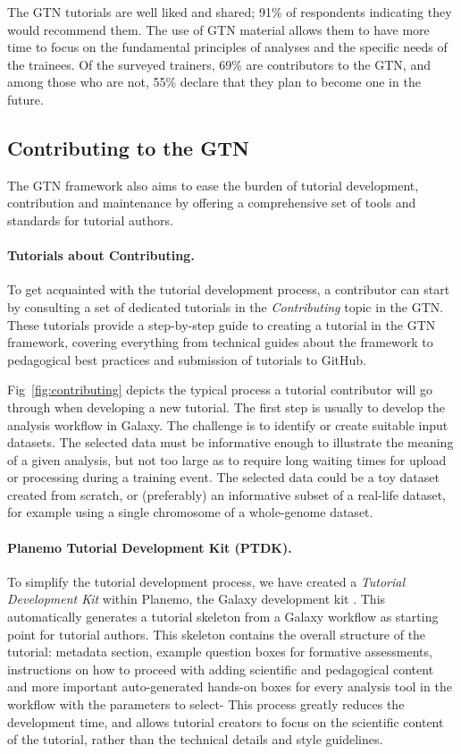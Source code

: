 The GTN tutorials are well liked and shared; 91\% of respondents indicating they would recommend them. The use of GTN material allows them to have more time to focus on the fundamental principles of analyses and the specific needs of the trainees. Of the surveyed trainers, 69\% are contributors to the GTN, and among those who are not, 55\% declare that they plan to become one in the future.

\subsection*{Contributing to the GTN}

The GTN framework also aims to ease the burden of tutorial development, contribution and maintenance by offering a comprehensive set of tools and standards for tutorial authors. 

\paragraph*{Tutorials about Contributing.} 
To get acquainted with the tutorial development process, a contributor can start by consulting a set of dedicated tutorials in the \emph{Contributing} topic in the GTN. These tutorials provide a step-by-step guide to creating a tutorial in the GTN framework, covering everything from technical guides about the framework to pedagogical best practices and submission of tutorials to GitHub.

Fig~\ref{fig:contributing} depicts the typical process a tutorial contributor will go through when developing a new tutorial. The first step is usually to develop the analysis workflow in Galaxy. The challenge is to identify or create suitable input datasets. The selected data must be informative enough to illustrate the meaning of a given analysis, but not too large as to require long waiting times for upload or processing during a training event. The selected data could be a toy dataset created from scratch, or (preferably) an informative subset of a real-life dataset, for example using a single chromosome of a whole-genome dataset.

\paragraph*{Planemo Tutorial Development Kit (PTDK).} To simplify the tutorial development process, we have created a \emph{Tutorial Development Kit} within Planemo, the Galaxy development kit \cite{bray2022planemo}. This automatically generates a tutorial skeleton from a Galaxy workflow as starting point for tutorial authors.
This skeleton contains the overall structure of the tutorial: metadata section, example question boxes for formative assessments, instructions on how to proceed with adding scientific and pedagogical content and more important auto-generated hands-on boxes for every analysis tool in the workflow with the parameters to select-
This process greatly reduces the development time, and allows tutorial creators to focus on the scientific content of the tutorial, rather than the technical details and style guidelines.

